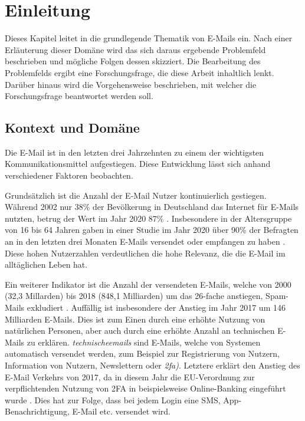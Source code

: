 
\chapter{Einleitung}
\label{Einleitung}

Dieses Kapitel leitet in die grundlegende Thematik von E-Mails ein. Nach einer Erläuterung dieser Domäne wird das sich daraus ergebende Problemfeld beschrieben und mögliche Folgen dessen skizziert. Die Bearbeitung des Problemfelds ergibt eine Forschungsfrage, die diese Arbeit inhaltlich lenkt. Darüber hinaus wird die Vorgehensweise beschrieben, mit welcher die Forschungsfrage beantwortet werden soll.

\section{Kontext und Domäne}
\label{Kontext_und_Domaene}
Die E-Mail ist in den letzten drei Jahrzehnten zu einem der wichtigsten Kommunikationsmittel aufgestiegen. Diese Entwicklung lässt sich anhand verschiedener Faktoren beobachten.

Grundsätzlich ist die Anzahl der E-Mail Nutzer kontinuierlich gestiegen. Während 2002 nur 38\% der Bevölkerung in Deutschland das Internet für E-Mails nutzten, betrug der Wert im Jahr 2020 87\% \citep{SAEU2022}. Insbesondere in der Altersgruppe von 16 bis 64 Jahren gaben in einer Studie im Jahr 2020 über 90\% der Befragten an in den letzten drei Monaten E-Mails versendet oder empfangen zu haben \citep{StatistischesBundesamt2021}. Diese hohen Nutzerzahlen verdeutlichen die hohe Relevanz, die die E-Mail im alltäglichen Leben hat.

Ein weiterer Indikator ist die Anzahl der versendeten E-Mails, welche von 2000 (32,3 Millarden) bis 2018 (848,1 Milliarden) um das 26-fache anstiegen, Spam-Mails exkludiert \citep{MMG2018}. Auffällig ist insbesondere der Anstieg im Jahr 2017 um 146 Milliarden E-Mails. Dies ist zum Einen durch eine erhöhte Nutzung von natürlichen Personen, aber auch durch eine erhöhte Anzahl an technischen E-Mails zu erklären.  \emph{\gls{technischeemail}s} sind E-Mails, welche von Systemen automatisch versendet werden, zum Beispiel zur Registrierung von Nutzern, Information von Nutzern, Newslettern oder \emph{\acrfull{2fa})}. Letztere erklärt den Anstieg des E-Mail Verkehrs von 2017, da in diesem Jahr die EU-Verordnung zur verpflichtenden Nutzung von 2FA in beispielsweise Online-Banking eingeführt wurde \citep{EuropaeischeKommission2017}. Dies hat zur Folge, dass bei jedem Login eine SMS, App-Benachrichtigung, E-Mail etc. versendet wird.

